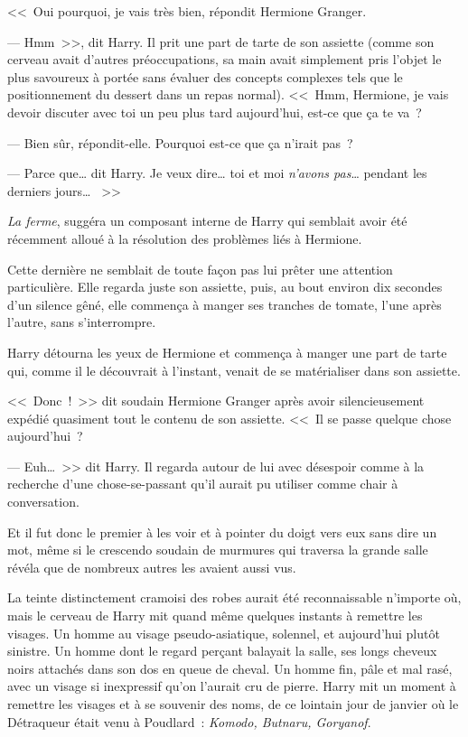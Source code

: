 <<~Oui pourquoi, je vais très bien, répondit Hermione Granger.

--- Hmm~>>, dit Harry. Il prit une part de tarte de son assiette (comme son cerveau avait d'autres préoccupations, sa main avait simplement pris l'objet le plus savoureux à portée sans évaluer des concepts complexes tels que le positionnement du dessert dans un repas normal). <<~Hmm, Hermione, je vais devoir discuter avec toi un peu plus tard aujourd'hui, est-ce que ça te va~?

--- Bien sûr, répondit-elle. Pourquoi est-ce que ça n'irait pas~?

--- Parce que… dit Harry. Je veux dire… toi et moi \emph{n'avons pas}… pendant les derniers jours… ~>>

\emph{La ferme}, suggéra un composant interne de Harry qui semblait avoir été récemment alloué à la résolution des problèmes liés à Hermione.

Cette dernière ne semblait de toute façon pas lui prêter une attention particulière. Elle regarda juste son assiette, puis, au bout environ dix secondes d'un silence gêné, elle commença à manger ses tranches de tomate, l'une après l'autre, sans s'interrompre.

Harry détourna les yeux de Hermione et commença à manger une part de tarte qui, comme il le découvrait à l'instant, venait de se matérialiser dans son assiette.

<<~Donc~!~>> dit soudain Hermione Granger après avoir silencieusement expédié quasiment tout le contenu de son assiette. <<~Il se passe quelque chose aujourd'hui~?

--- Euh…~>> dit Harry. Il regarda autour de lui avec désespoir comme à la recherche d'une chose-se-passant qu'il aurait pu utiliser comme chair à conversation.

Et il fut donc le premier à les voir et à pointer du doigt vers eux sans dire un mot, même si le crescendo soudain de murmures qui traversa la grande salle révéla que de nombreux autres les avaient aussi vus.

La teinte distinctement cramoisi des robes aurait été reconnaissable n'importe où, mais le cerveau de Harry mit quand même quelques instants à remettre les visages. Un homme au visage pseudo-asiatique, solennel, et aujourd'hui plutôt sinistre. Un homme dont le regard perçant balayait la salle, ses longs cheveux noirs attachés dans son dos en queue de cheval. Un homme fin, pâle et mal rasé, avec un visage si inexpressif qu'on l'aurait cru de pierre. Harry mit un moment à remettre les visages et à se souvenir des noms, de ce lointain jour de janvier où le Détraqueur était venu à Poudlard~: \emph{Komodo, Butnaru, Goryanof}.

